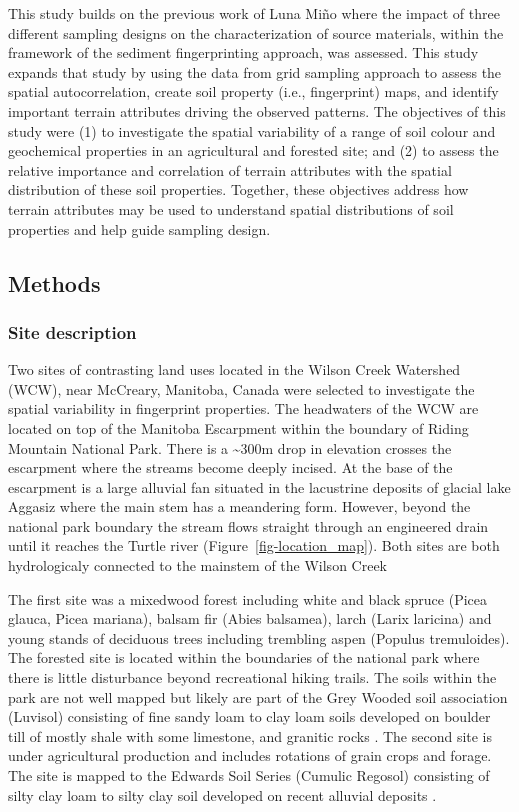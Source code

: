 \documentclass[
  number]{elsarticle}
\begin{document}
This study builds on the previous work of Luna Miño \citep{lunamiño2024}
where the impact of three different sampling designs on the
characterization of source materials, within the framework of the
sediment fingerprinting approach, was assessed. This study expands that
study by using the data from grid sampling approach to assess the
spatial autocorrelation, create soil property (i.e., fingerprint) maps,
and identify important terrain attributes driving the observed patterns.
The objectives of this study were (1) to investigate the spatial
variability of a range of soil colour and geochemical properties in an
agricultural and forested site; and (2) to assess the relative
importance and correlation of terrain attributes with the spatial
distribution of these soil properties. Together, these objectives
address how terrain attributes may be used to understand spatial
distributions of soil properties and help guide sampling design.

\subsection{Methods}\label{methods}

\subsubsection{Site description}\label{site-description}

Two sites of contrasting land uses located in the Wilson Creek Watershed
(WCW), near McCreary, Manitoba, Canada were selected to investigate the
spatial variability in fingerprint properties. The headwaters of the WCW
are located on top of the Manitoba Escarpment within the boundary of
Riding Mountain National Park. There is a \textasciitilde300m drop in
elevation crosses the escarpment where the streams become deeply
incised. At the base of the escarpment is a large alluvial fan situated
in the lacustrine deposits of glacial lake Aggasiz where the main stem
has a meandering form. However, beyond the national park boundary the
stream flows straight through an engineered drain until it reaches the
Turtle river (Figure~\ref{fig-location_map}). Both sites are both
hydrologicaly connected to the mainstem of the Wilson Creek

The first site was a mixedwood forest including white and black spruce
(Picea glauca, Picea mariana), balsam fir (Abies balsamea), larch (Larix
laricina) and young stands of deciduous trees including trembling aspen
(Populus tremuloides). The forested site is located within the
boundaries of the national park where there is little disturbance beyond
recreational hiking trails. The soils within the park are not well
mapped but likely are part of the Grey Wooded soil association (Luvisol)
consisting of fine sandy loam to clay loam soils developed on boulder
till of mostly shale with some limestone, and granitic rocks
\citep{ehrlich1958}. The second site is under agricultural production
and includes rotations of grain crops and forage. The site is mapped to
the Edwards Soil Series (Cumulic Regosol) consisting of silty clay loam
to silty clay soil developed on recent alluvial deposits
\citep{ehrlich1958}.
\end{document}

